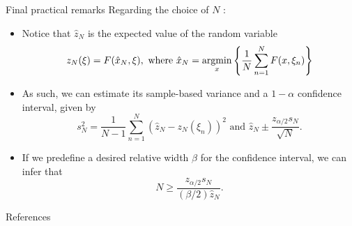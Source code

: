 \begin{frame}{Final practical remarks}
	Regarding the choice of $N$ {\small \cite{oliveira2012optimization}}:
	\begin{itemize}[<+->]
		\item Notice that $\hat{z}_N$ is the expected value of the \alert{random variable}
		$$
			z_N(\xi) = F(\hat{x}_N, \xi), \text { where } \hat{x}_N = \mathop{\rm argmin}_x \left\{ \frac{1}{N}\sum_{n=1}^N F(x,\xi_n) \right \}
		$$
		\item As such, we can estimate its sample-based variance and a $1-\alpha$ confidence interval, given by
		$$
			s_N^2 = \frac{1}{N-1}\sum_{n=1}^N (\hat{z}_N - z_N(\xi_n))^2 \text{ and } \hat{z}_N \pm \frac{z_{\alpha/2} s_N}{\sqrt{N}}.
		$$
		\item If we predefine a desired \alert{relative width} $\beta$ for the confidence interval, we can infer that
		$$
			N \ge \frac{z_{\alpha/2}s_N}{(\beta/2)\hat{z}_N}.
		$$
		
	\end{itemize}
	
\end{frame}

\begin{frame}[allowframebreaks]{References}
	
	
\end{frame}


